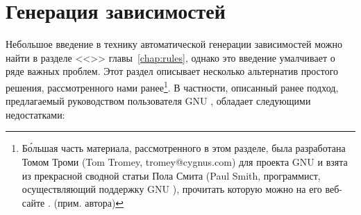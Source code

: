 \section{Генерация зависимостей}

Небольшое введение в технику автоматической генерации зависимостей
можно найти в разделе <<>>
главы~\ref{chap:rules}, однако это введение умалчивает о ряде важных
проблем. Этот раздел описывает несколько альтернатив
простого решения, рассмотренного нами ранее\footnote{%
Б\'{о}льшая часть материала, рассмотренного в этом разделе, была
разработана Томом Троми (Tom Tromey, tromey@cygnus.com) для проекта
GNU  и взята из прекрасной сводной статьи Пола Смита
(Paul Smith, программист, осуществляющий поддержку GNU \GNUmake{}),
прочитать которую можно на его веб-сайте
. (прим. автора)}.
В частности, описанный ранее подход, предлагаемый руководством
пользователя GNU \GNUmake{}, обладает следующими недостатками:

